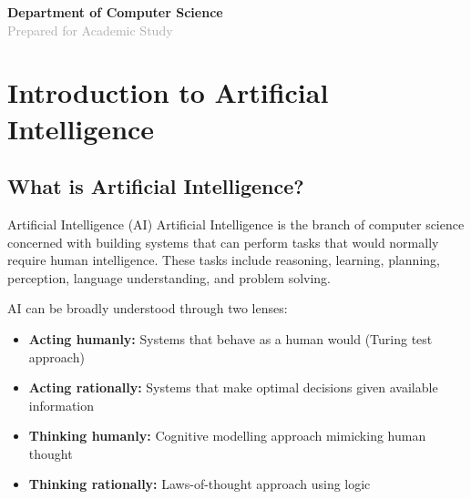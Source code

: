 \documentclass[12pt,a4paper]{report}
\begin{document}
\begin{titlepage}
\begin{center}
{
}
\end{center}

\vfill
{\large\textcolor{primary}{\textbf{Department of Computer Science}}}\\[0.2cm]
{\normalsize\textcolor{darkgray}{Prepared for Academic Study}}
\end{titlepage}

\tableofcontents
\newpage

\chapter{Introduction to Artificial Intelligence}

\section{What is Artificial Intelligence?}

\begin{defbox}{Artificial Intelligence (AI)}
Artificial Intelligence is the branch of computer science concerned with building systems that can perform tasks that would normally require human intelligence. These tasks include reasoning, learning, planning, perception, language understanding, and problem solving.
\end{defbox}

AI can be broadly understood through two lenses:
\begin{itemize}[noitemsep]
  \item \textbf{Acting humanly:} Systems that behave as a human would (Turing test approach)
  \item \textbf{Acting rationally:} Systems that make optimal decisions given available information
  \item \textbf{Thinking humanly:} Cognitive modelling approach mimicking human thought
  \item \textbf{Thinking rationally:} Laws-of-thought approach using logic
\end{itemize}
\end{document}
